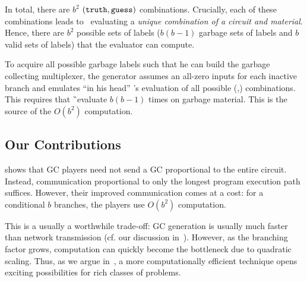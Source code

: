 In total, there are $b^2$ $(\mathtt{truth}, \mathtt{guess})$ combinations.
Crucially, each of these combinations leads to \E\ evaluating a
\emph{unique combination of a circuit and material}.
Hence, there are $b^2$ possible sets of labels ($b(b-1)$ garbage sets of labels and $b$ valid sets of labels)  that the evaluator
can compute.
%


To acquire all possible garbage labels such that he can build the
garbage collecting multiplexer, the \HK generator assumes an all-zero
inputs for each
inactive branch and emulates ``in his head'' \E's evaluation of all possible (\truth,\guess) combinations.
This requires that \G\ evaluate $b(b-1)$ times on garbage material.
This is the source of the $O(b^2)$ computation.









\subsection{Our Contributions}
\label{sec:ourContrib}

\HK shows that GC players need not send a GC
proportional to the entire circuit.
Instead, communication proportional to only the longest program execution
path suffices.
However, their improved communication comes at a cost:
for a conditional $b$ branches, the players
use $O(b^2)$ computation. 

This is a usually a worthwhile trade-off: GC generation is usually
much faster than network transmission (cf. our discussion in~).
However, as the branching factor grows, computation
can quickly become the bottleneck due to quadratic scaling.
%
Thus, as we argue in~,
a more computationally efficient technique
opens exciting possibilities for rich classes of problems.

